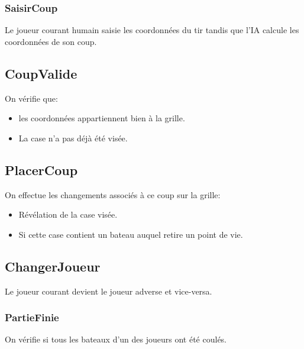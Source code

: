                     \subsubsection{SaisirCoup}
                        Le joueur courant humain saisie les coordonnées du tir tandis que l'IA calcule les coordonnées de son coup. 
                    \subsection{CoupValide}
                        On vérifie que:
                        \begin{itemize}
                            \item les coordonnées appartiennent bien à la grille.
                            \item La case n'a pas déjà été visée.
                        \end{itemize}
                    \subsection{PlacerCoup}
                        On effectue les changements associés à ce coup sur la grille:
                        \begin{itemize}
                            \item Rév\'elation de la case visée.
                            \item Si cette case contient un bateau auquel retire un point de vie.
                        \end{itemize}
                    \subsection{ChangerJoueur}
                        Le joueur courant devient le joueur adverse et vice-versa.
            \subsubsection{PartieFinie}
                On vérifie si tous les bateaux d'un des joueurs ont été coulés.
